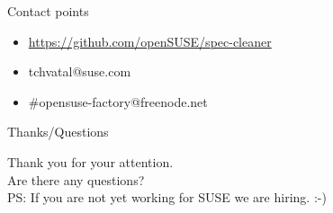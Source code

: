 \documentclass{beamer}
\begin{document}
\begin{frame}[t]{Contact points}
	\begin{itemize}
	\item \url{https://github.com/openSUSE/spec-cleaner}
	\item tchvatal@suse.com
	\item \#opensuse-factory@freenode.net 
	\end{itemize}
\end{frame}

\begin{frame}{Thanks/Questions}
	\begin{center}
	Thank you for your attention.\\
	Are there any questions? \\
		\vspace{1in}
		PS: If you are not yet working for SUSE we are hiring. :-)
	\end{center}
\end{frame}
\end{document}
